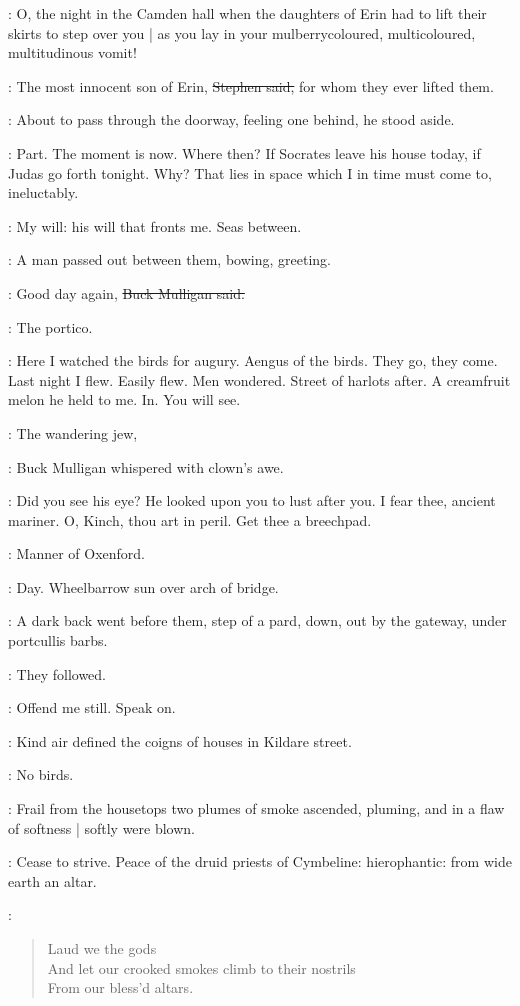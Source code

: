 \mulligan:
O,
the night in the Camden hall when the daughters of Erin had to lift their skirts to step over you |
as you lay in your mulberrycoloured, multicoloured, multitudinous vomit!

\Stephen:
The most innocent son of Erin,
\sout{Stephen said,}
for whom they ever lifted them.

:
About to pass through the doorway,
feeling one behind,
he stood aside.

\StephenInt:
Part.
The moment is now.
Where then?
If Socrates leave his house today,
if Judas go forth tonight.
Why?
That lies in space which I in time must come to,
ineluctably.

\StephenInt:
My will:
his will that fronts me.
Seas between.

:
A man passed out between them,
bowing,
greeting.

\mulligan:
Good day again,
\sout{Buck Mulligan said.}

\StephenInt:
The portico.

\StephenInt:
Here I watched the birds for augury.
Aengus of the birds.
They go,
they come.
Last night I flew.
Easily flew.
Men wondered.
Street of harlots after.
A creamfruit melon he held to me.
In.
You will see.

\mulligan:
The wandering jew,

:
Buck Mulligan whispered with clown's awe.

\mulligan:
Did you see his eye?
He looked upon you to lust after you.
I fear thee,
ancient mariner.
O, Kinch,
thou art in peril.
Get thee a breechpad.

\StephenInt:
Manner of Oxenford.

\StephenInt:
Day.
Wheelbarrow sun over arch of bridge.

:
A dark back went before them,
step of a pard,
down,
out by the gateway,
under portcullis barbs.

:
They followed.

\StephenInt:
Offend me still.
Speak on.

:
Kind air defined the coigns of houses in Kildare street.

\StephenInt:
No birds.

:
Frail from the housetops two plumes of smoke ascended,
pluming,
and in a flaw of softness |
softly were blown.

\StephenInt:
Cease to strive.
Peace of the druid priests of Cymbeline:
hierophantic:
from wide earth an altar.

\StephenInt:
\begin{verse}
    Laud we the gods \\
    And let our crooked smokes climb to their nostrils \\
    From our bless'd altars.
\end{verse}


